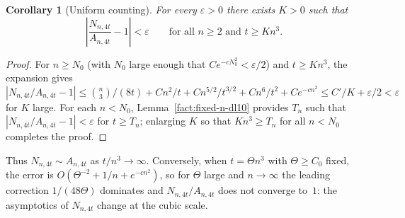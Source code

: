 \documentclass[11pt]{article}
\newtheorem{corollary}[theorem]{Corollary}
\theoremstyle{definition}
\begin{document}
\begin{corollary}[Uniform counting]\label{cor:uniform}
For every \(\varepsilon>0\) there exists \(K>0\) such that
\[
  \left|\frac{N_{n,4t}}{A_{n,4t}}-1\right|<\varepsilon
  \qquad\text{for all } n\ge 2 \text{ and } t\ge Kn^3.
\]
\end{corollary}

\begin{proof}
For \(n\ge N_0\) (with \(N_0\) large enough that \(Ce^{-cN_0^2}<\varepsilon/2\)) and \(t\ge Kn^3\), the expansion gives \(|N_{n,4t}/A_{n,4t}-1|\le \binom{n}{3}/(8t)+Cn^2/t+Cn^{5/2}/t^{3/2}+Cn^6/t^2+Ce^{-cn^2}\le C'/K+\varepsilon/2<\varepsilon\) for \(K\) large. For each \(n<N_0\), Lemma~\ref{fact:fixed-n-dl10} provides \(T_n\) such that \(|N_{n,4t}/A_{n,4t}-1|<\varepsilon\) for \(t\ge T_n\); enlarging \(K\) so that \(Kn^3\ge T_n\) for all \(n<N_0\) completes the proof.
\end{proof}

Thus \(N_{n,4t}\sim A_{n,4t}\) as \(t/n^3\to\infty\). Conversely, when \(t=\Theta n^3\) with \(\Theta\ge C_0\) fixed, the error is \(O(\Theta^{-2}+1/n+e^{-cn^2})\), so for \(\Theta\) large and \(n\to\infty\) the leading correction \(1/(48\Theta)\) dominates and \(N_{n,4t}/A_{n,4t}\) does not converge to~\(1\): the asymptotics of \(N_{n,4t}\) change at the cubic scale.



\end{document}
